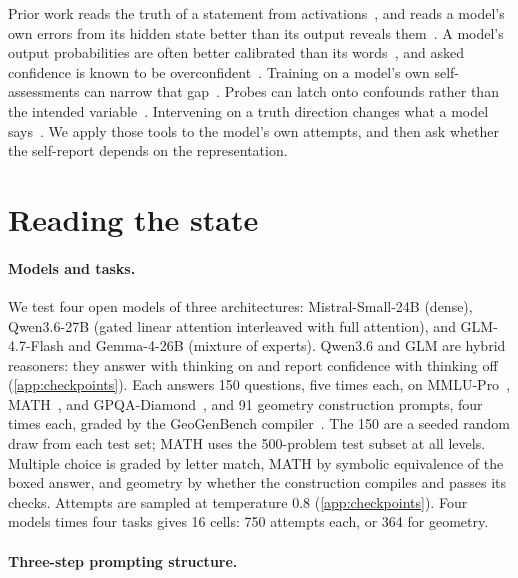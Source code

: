\documentclass{article}
\begin{document}
Prior work reads the truth of a statement from activations~\citep{azaria2023internal, burns2023discovering, marks2024geometry}, and reads a model's own errors from its hidden state better than its output reveals them~\citep{orgad2025llms, chwang2024androids}.
A model's output probabilities are often better calibrated than its words~\citep{kadavath2022language}, and asked confidence is known to be overconfident~\citep{lin2022teaching, tian2023just, xiong2024can}.
Training on a model's own self-assessments can narrow that gap~\citep{liu2026rlmf}.
Probes can latch onto confounds rather than the intended variable~\citep{levinstein2024still}.
Intervening on a truth direction changes what a model says~\citep{li2023iti, zou2023representation}.
We apply those tools to the model's own attempts, and then ask whether the self-report depends on the representation.

\section{Reading the state}
\label{sec:reading}

\paragraph{Models and tasks.}
We test four open models of three architectures: Mistral-Small-24B (dense), Qwen3.6-27B (gated linear attention interleaved with full attention), and GLM-4.7-Flash and Gemma-4-26B (mixture of experts).
Qwen3.6 and GLM are hybrid reasoners: they answer with thinking on and report confidence with thinking off (\cref{app:checkpoints}).
Each answers 150 questions, five times each, on MMLU-Pro~\citep{wang2024mmlupro}, MATH~\citep{hendrycks2021math}, and GPQA-Diamond~\citep{rein2023gpqa}, and 91 geometry construction prompts, four times each, graded by the GeoGenBench compiler~\citep{chen2026geogenbench}.
The 150 are a seeded random draw from each test set; MATH uses the 500-problem test subset at all levels.
Multiple choice is graded by letter match, MATH by symbolic equivalence of the boxed answer, and geometry by whether the construction compiles and passes its checks.
Attempts are sampled at temperature 0.8 (\cref{app:checkpoints}).
Four models times four tasks gives 16 cells: 750 attempts each, or 364 for geometry.

\paragraph{Three-step prompting structure.}
\end{document}
